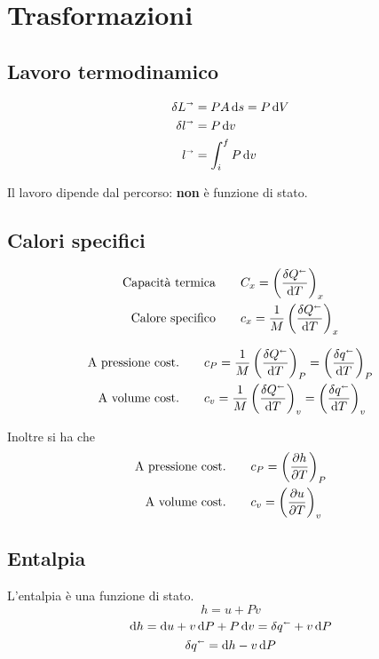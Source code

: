 \section{Trasformazioni}

\subsection{Lavoro termodinamico}

\begin{align*}
    \delta L^\shortrightarrow &= PA\dd{s} = P\dd{V} \\
    \delta l^\shortrightarrow &= P\dd{v} \\
    l^\shortrightarrow &= \int_i^f P\dd{v}
\end{align*}

Il lavoro dipende dal percorso: \textbf{non} è funzione di stato.

\subsection{Calori specifici}

\begin{align*}
    \text{Capacità termica} &\qquad C_x = \left(\frac{\delta Q^\shortleftarrow}{\dd{T}}\right)_x \\
    \text{Calore specifico} &\qquad c_x = \frac{1}{M} \left(\frac{\delta Q^\shortleftarrow}{\dd{T}}\right)_x
\end{align*}

\begin{align*}
    \text{A pressione cost.} &\qquad c_P = \frac{1}{M} \left(\frac{\delta Q^\shortleftarrow}{\dd{T}}\right)_P = \left(\frac{\delta q^\shortleftarrow}{\dd{T}}\right)_P \\
    \text{A volume cost.} &\qquad c_v = \frac{1}{M} \left(\frac{\delta Q^\shortleftarrow}{\dd{T}}\right)_v = \left(\frac{\delta q^\shortleftarrow}{\dd{T}}\right)_v
\end{align*}

Inoltre si ha che
\begin{align*}
    \text{A pressione cost.} &\qquad c_P = \qty(\pdv{h}{T})_P\\
    \text{A volume cost.} &\qquad c_v = \qty(\pdv{u}{T})_v
\end{align*}

\subsection{Entalpia}

L'entalpia è una funzione di stato.
\[ h = u + Pv \]
\[ \dd{h} = \dd{u} + v\dd{P} + P\dd{v} = \delta q^\shortleftarrow + v\dd{P} \]
\[ \delta q^\shortleftarrow = \dd{h} - v\dd{P} \]
